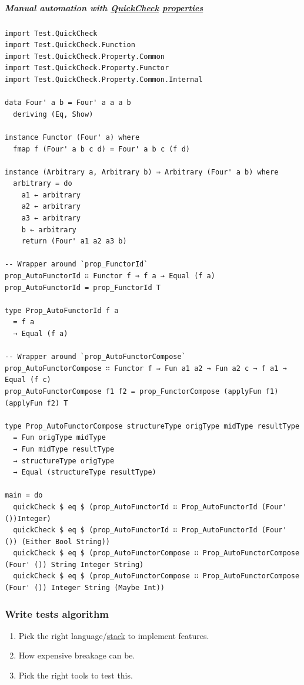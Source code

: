 \documentclass[11pt]{article}
\begin{document}
\subparagraph{Manual automation with \hyperref[org1fdb89a]{QuickCheck} \hyperref[org85fb3a1]{properties}}
\label{sec:orgae679a2}

\begin{verbatim}
import Test.QuickCheck
import Test.QuickCheck.Function
import Test.QuickCheck.Property.Common
import Test.QuickCheck.Property.Functor
import Test.QuickCheck.Property.Common.Internal

data Four' a b = Four' a a a b
  deriving (Eq, Show)

instance Functor (Four' a) where
  fmap f (Four' a b c d) = Four' a b c (f d)

instance (Arbitrary a, Arbitrary b) ⇒ Arbitrary (Four' a b) where
  arbitrary = do
    a1 ← arbitrary
    a2 ← arbitrary
    a3 ← arbitrary
    b ← arbitrary
    return (Four' a1 a2 a3 b)

-- Wrapper around `prop_FunctorId`
prop_AutoFunctorId ∷ Functor f ⇒ f a → Equal (f a)
prop_AutoFunctorId = prop_FunctorId T

type Prop_AutoFunctorId f a
  = f a
  → Equal (f a)

-- Wrapper around `prop_AutoFunctorCompose`
prop_AutoFunctorCompose ∷ Functor f ⇒ Fun a1 a2 → Fun a2 c → f a1 → Equal (f c)
prop_AutoFunctorCompose f1 f2 = prop_FunctorCompose (applyFun f1) (applyFun f2) T

type Prop_AutoFunctorCompose structureType origType midType resultType
  = Fun origType midType
  → Fun midType resultType
  → structureType origType
  → Equal (structureType resultType)

main = do
  quickCheck $ eq $ (prop_AutoFunctorId ∷ Prop_AutoFunctorId (Four' ())Integer)
  quickCheck $ eq $ (prop_AutoFunctorId ∷ Prop_AutoFunctorId (Four' ()) (Either Bool String))
  quickCheck $ eq $ (prop_AutoFunctorCompose ∷ Prop_AutoFunctorCompose (Four' ()) String Integer String)
  quickCheck $ eq $ (prop_AutoFunctorCompose ∷ Prop_AutoFunctorCompose (Four' ()) Integer String (Maybe Int))
\end{verbatim}

\subsubsection{Write tests algorithm}
\label{sec:orgb9723c9}

\begin{enumerate}
\item Pick the right language/\hyperref[org02af145]{stack} to implement features.\\
\item How expensive breakage can be.\\
\item Pick the right tools to test this.\\
\end{enumerate}
\end{document}
